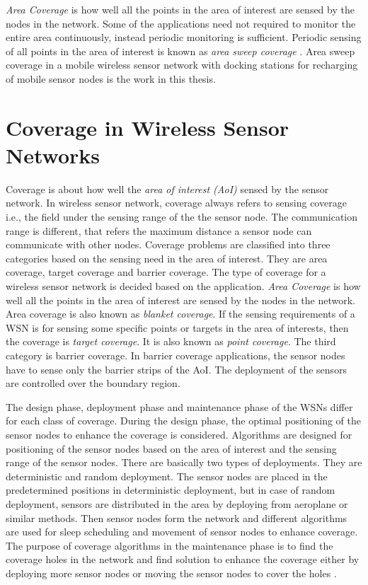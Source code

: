 \textit{Area Coverage} is how well all the points in the area of interest are sensed by the nodes in the network. Some of the applications need not required to monitor the entire area continuously, instead periodic monitoring is sufficient. Periodic sensing of all points in the area of interest is known as \textit{area sweep coverage} \cite{gorain2013point}. Area sweep coverage in a mobile wireless sensor network with docking stations for recharging of mobile sensor nodes is the work in this thesis.



\section{Coverage in Wireless Sensor Networks}

Coverage is about how well the \textit{area of interest (AoI)} sensed by the sensor network. In wireless sensor network, coverage always refers to sensing coverage i.e., the field under the sensing range of the the sensor node. The communication range is different, that refers the maximum distance a sensor node can communicate with other nodes.
Coverage problems are classified into three categories based on the sensing need in the area of interest. They are area coverage, target coverage and barrier coverage. The type of coverage for a wireless sensor network is decided based on the application. \textit{Area Coverage} is how well all the points in the area of interest are sensed by the nodes in the network. Area coverage is also known as \textit{blanket coverage}. If the sensing requirements of a WSN is for sensing some specific points or targets in the area of interests, then the coverage is \textit{target coverage}. It is also known as \textit{point coverage}.  The third category is barrier coverage. In barrier coverage applications, the sensor nodes have to sense only the barrier strips of the AoI. The deployment of the sensors are controlled over the boundary region. 

The design phase, deployment phase and maintenance phase of the WSNs differ for each class of coverage. During the design phase, the optimal positioning of the sensor nodes to enhance the coverage is considered. Algorithms are designed for positioning of the sensor nodes based on the area of interest and the sensing range of the sensor nodes. There are basically two types of deployments. They are deterministic and random deployment. The sensor nodes are placed in the predetermined positions in deterministic deployment, but in case of random deployment, sensors are distributed in the area by deploying from aeroplane or similar methods. Then sensor nodes form the network and different algorithms are used for sleep scheduling and movement of sensor nodes to enhance coverage. The purpose of coverage algorithms in the maintenance phase is to find the coverage holes in the network and find solution to enhance the coverage either by deploying more sensor nodes or moving the sensor nodes to cover the holes \cite{vecchio2015improving}. 

